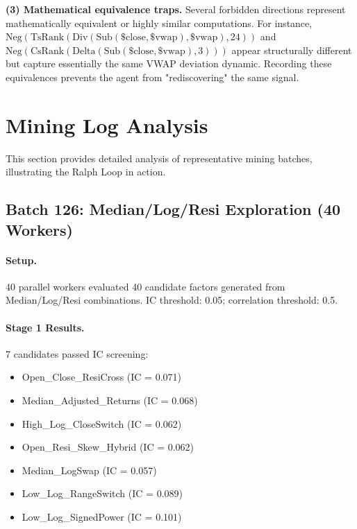 \documentclass[sigconf]{acmart}
\begin{document}
\textbf{(3) Mathematical equivalence traps.}
Several forbidden directions represent mathematically equivalent or highly similar computations.
For instance, $\text{Neg}(\text{TsRank}(\text{Div}(\text{Sub}(\$\text{close}, \$\text{vwap}), \$\text{vwap}), 24))$ and $\text{Neg}(\text{CsRank}(\text{Delta}(\text{Sub}(\$\text{close}, \$\text{vwap}), 3)))$ appear structurally different but capture essentially the same VWAP deviation dynamic.
Recording these equivalences prevents the agent from "rediscovering" the same signal.

\section{Mining Log Analysis}
\label{app:mining-log}

This section provides detailed analysis of representative mining batches, illustrating the Ralph Loop in action.

\subsection{Batch 126: Median/Log/Resi Exploration (40 Workers)}

\paragraph{Setup.}
40 parallel workers evaluated 40 candidate factors generated from Median/Log/Resi combinations.
IC threshold: 0.05; correlation threshold: 0.5.

\paragraph{Stage 1 Results.}
7 candidates passed IC screening:
{\setlength{\leftmargini}{1.4em}%
\begin{itemize}
  \item Open\_Close\_ResiCross (IC = 0.071)
  \item Median\_Adjusted\_Returns (IC = 0.068)
  \item High\_Log\_CloseSwitch (IC = 0.062)
  \item Open\_Resi\_Skew\_Hybrid (IC = 0.062)
  \item Median\_LogSwap (IC = 0.057)
  \item Low\_Log\_RangeSwitch (IC = 0.089)
  \item Low\_Log\_SignedPower (IC = 0.101)
\end{itemize}
}
\end{document}
